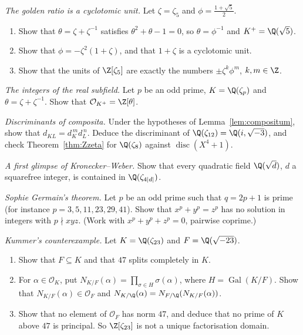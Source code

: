 \begin{exercise}[$\star\star$]\label{ex:golden}
\emph{The golden ratio is a cyclotomic unit.} Let $\zeta=\zeta_5$ and $\phi=\frac{1+\sqrt5}2$.
\begin{enumerate}[label=(\alph*)]
\item Show that $\theta=\zeta+\zeta^{-1}$ satisfies $\theta^2+\theta-1=0$, so $\theta=\phi^{-1}$ and $K^+=\Q(\sqrt5)$.
\item Show that $\phi=-\zeta^2(1+\zeta)$, and that $1+\zeta$ is a cyclotomic unit.
\item Show that the units of $\Z[\zeta_5]$ are exactly the numbers $\pm\zeta^k\phi^m$, $k,m\in\Z$.
\end{enumerate}
\end{exercise}

\begin{exercise}[$\star\star$]\label{ex:realint}
\emph{The integers of the real subfield.} Let $p$ be an odd prime, $K=\Q(\zeta_p)$ and $\theta=\zeta+\zeta^{-1}$. Show that
$\mathcal O_{K^+}=\Z[\theta]$.
\end{exercise}

\begin{exercise}[$\star\star$]\label{ex:compdisc}
\emph{Discriminants of composita.} Under the hypotheses of Lemma~\ref{lem:compositum}, show that $d_{KL}=d_K^{\,m}d_L^{\,n}$.
Deduce the discriminant of $\Q(\zeta_{12})=\Q(i,\sqrt{-3})$, and check Theorem~\ref{thm:Zzeta} for $\Q(\zeta_8)$ against
$\operatorname{disc}(X^4+1)$.
\end{exercise}

\begin{exercise}[$\star\star$]\label{ex:quadcyclo}
\emph{A first glimpse of Kronecker--Weber.} Show that every quadratic field $\Q(\sqrt d)$, $d$ a squarefree integer, is
contained in $\Q(\zeta_{4|d|})$.
\end{exercise}

\begin{exercise}[$\star\star\star$]\label{ex:germain}
\emph{Sophie Germain's theorem.} Let $p$ be an odd prime such that $q=2p+1$ is prime (for instance $p=3,5,11,23,29,41$).
Show that $x^p+y^p=z^p$ has no solution in integers with $p\nmid xyz$. (Work with $x^p+y^p+z^p=0$, pairwise coprime.)
\end{exercise}

\begin{exercise}[$\star\star\star$]\label{ex:kummer23}
\emph{Kummer's counterexample.} Let $K=\Q(\zeta_{23})$ and $F=\Q(\sqrt{-23})$.
\begin{enumerate}[label=(\alph*)]
\item Show that $F\subseteq K$ and that $47$ splits completely in $K$.
\item For $\alpha\in\mathcal O_K$, put $N_{K/F}(\alpha)=\prod_{\sigma\in H}\sigma(\alpha)$, where $H=\operatorname{Gal}(K/F)$.
Show that $N_{K/F}(\alpha)\in\mathcal O_F$ and $N_{K/\Q}(\alpha)=N_{F/\Q}(N_{K/F}(\alpha))$.
\item Show that no element of $\mathcal O_F$ has norm $47$, and deduce that no prime of $K$ above $47$ is principal. So
$\Z[\zeta_{23}]$ is not a unique factorisation domain.
\end{enumerate}
\end{exercise}

